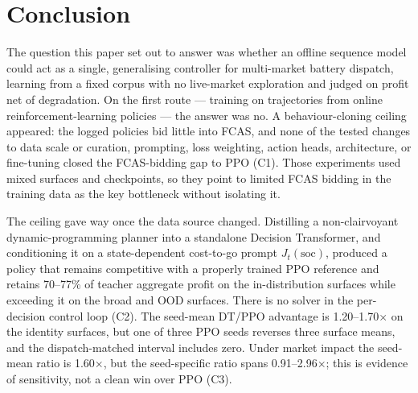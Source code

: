 \documentclass{article}
\begin{document}
\section{Conclusion}
\label{sec:conclusion}

The question this paper set out to answer was whether an offline sequence model
could act as a single, generalising controller for multi-market battery
dispatch, learning from a fixed corpus with no live-market exploration and
judged on profit net of degradation. On the first route --- training on
trajectories from online reinforcement-learning policies --- the answer was no.
A behaviour-cloning ceiling appeared: the logged policies bid little into FCAS,
and none of the tested changes to data scale or curation, prompting, loss
weighting, action heads, architecture, or fine-tuning closed the FCAS-bidding
gap to PPO (C1). Those
experiments used mixed surfaces and checkpoints, so they point to limited FCAS
bidding in the training data as the key bottleneck without isolating it.

The ceiling gave way once the data source changed. Distilling a non-clairvoyant
dynamic-programming planner into a standalone Decision Transformer, and
conditioning it on a state-dependent cost-to-go prompt
$J_t(\mathrm{soc})$, produced a policy that remains competitive with a properly
trained PPO reference and retains 70--77\% of teacher aggregate profit on the
in-distribution surfaces while exceeding it on the broad and OOD surfaces.
There is no solver in the per-decision control loop (C2). The seed-mean DT/PPO
advantage is 1.20--1.70$\times$ on the identity surfaces, but one of three PPO
seeds reverses three surface means, and the dispatch-matched interval includes
zero. Under market impact the seed-mean ratio is 1.60$\times$, but the
seed-specific ratio spans 0.91--2.96$\times$; this is evidence of sensitivity,
not a clean win over PPO (C3).
\end{document}
